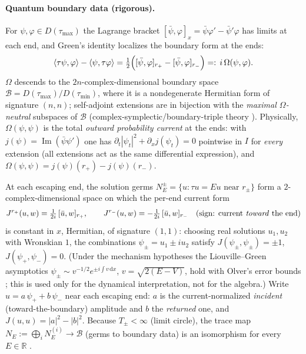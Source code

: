 \documentclass[11pt]{article}
\theoremstyle{remark}
\newcommand{\dd}{\mathrm{d}}
\newcommand{\R}{\mathbb{R}}
\begin{document}
\paragraph{Quantum boundary data (rigorous).}
For $\psi,\varphi\in D(\tau_{\max})$ the Lagrange bracket
$[\bar\psi,\varphi]_x=\bar\psi\varphi'-\bar\psi'\varphi$ has limits at
each end, and Green's identity localizes the boundary form at the ends:
\begin{equation}
\langle\tau\psi,\varphi\rangle-\langle\psi,\tau\varphi\rangle
=\tfrac12\Bigl([\bar\psi,\varphi]_{r_+}-[\bar\psi,\varphi]_{r_-}\Bigr)
=:\,i\,\Omega(\psi,\varphi).
\label{eq:green}
\end{equation}
$\Omega$ descends to the $2n$-complex-dimensional boundary space
$\mathcal B=D(\tau_{\max})/D(\tau_{\min})$, where it is a
nondegenerate Hermitian form of signature $(n,n)$; self-adjoint
extensions are in bijection with the \emph{maximal $\Omega$-neutral}
subspaces of $\mathcal B$ (complex-symplectic/boundary-triple theory
\cite{EverittMarkus,BHS,Weidmann,Zettl}).  Physically,
$\Omega(\psi,\psi)$ is the total \emph{outward probability current} at
the ends: with $j(\psi)=\operatorname{Im}(\bar\psi\psi')$ one has
$\partial_t|\psi_t|^2+\partial_x j(\psi_t)=0$ pointwise in $I$ for
\emph{every} extension (all extensions act as the same differential
expression), and $\Omega(\psi,\psi)=j(\psi)(r_+)-j(\psi)(r_-)$.

At each escaping end, the solution germs
$N_E^{\pm}=\{u:\tau u=Eu \text{ near } r_\pm\}$ form a
$2$-complex-dimensional space on which the per-end current form
\[
J^{r_+}(u,w)=\tfrac1{2i}\,[\bar u,w]_{r_+},\qquad
J^{r_-}(u,w)=-\tfrac1{2i}\,[\bar u,w]_{r_-}
\quad(\text{sign: current \emph{toward} the end})
\]
is constant in $x$, Hermitian, of signature $(1,1)$: choosing real
solutions $u_1,u_2$ with Wronskian $1$, the combinations
$\psi_\pm=u_1\pm iu_2$ satisfy $J(\psi_\pm,\psi_\pm)=\pm1$,
$J(\psi_+,\psi_-)=0$.  (Under the mechanism hypotheses the
Liouville--Green asymptotics
$\psi_\pm\sim v^{-1/2}e^{\pm i\int v\,\dd x}$, $v=\sqrt{2(E-V)}$, hold
with Olver's error bounds \cite{Olver}; this is used only for the
dynamical interpretation, not for the algebra.)  Write
$u=a\,\psi_++b\,\psi_-$ near each escaping end: $a$ is the
current-normalized \emph{incident} (toward-the-boundary) amplitude and
$b$ the \emph{returned} one, and
$J(u,u)=|a|^2-|b|^2$.  Because $T_\pm<\infty$ (limit circle), the trace
map $N_E:=\bigoplus_i N_E^{(i)}\to\mathcal B$ (germs to boundary data)
is an isomorphism for every $E\in\R$ \cite{Weidmann,Zettl}.
\end{document}
